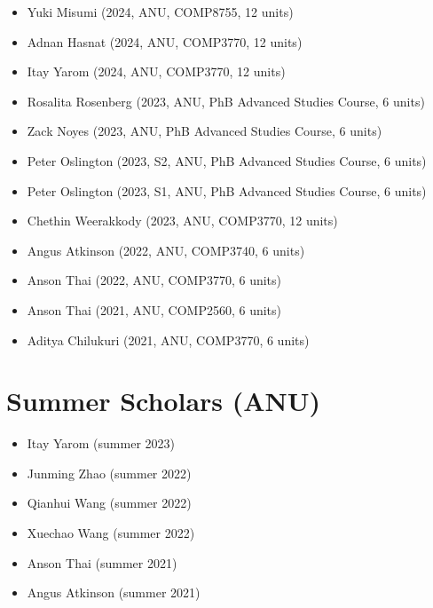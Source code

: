 \documentclass[singlecolumn,singlespace,11pt]{article}
\begin{document}
\begin{itemize}

\item Yuki Misumi (2024, ANU, COMP8755, 12 units)
\item Adnan Hasnat (2024, ANU, COMP3770, 12 units)
\item Itay Yarom (2024, ANU, COMP3770, 12 units)
\item Rosalita Rosenberg (2023, ANU, PhB Advanced Studies Course, 6 units)
\item Zack Noyes (2023, ANU, PhB Advanced Studies Course, 6 units)
\item Peter Oslington (2023, S2, ANU, PhB Advanced Studies Course, 6 units)
\item Peter Oslington (2023, S1, ANU, PhB Advanced Studies Course, 6 units)
\item Chethin Weerakkody (2023, ANU, COMP3770, 12 units)
\item Angus Atkinson (2022, ANU, COMP3740, 6 units)
\item Anson Thai (2022, ANU, COMP3770, 6 units)
\item Anson Thai (2021, ANU, COMP2560, 6 units)
\item Aditya Chilukuri (2021, ANU, COMP3770, 6 units)

\end{itemize}

\section*{Summer Scholars (ANU)}

\begin{itemize}

\item Itay Yarom (summer 2023)
\item Junming Zhao (summer 2022)
\item Qianhui Wang (summer 2022)
\item Xuechao Wang (summer 2022)
\item Anson Thai (summer 2021)
\item Angus Atkinson (summer 2021)

\end{itemize}
\end{document}
